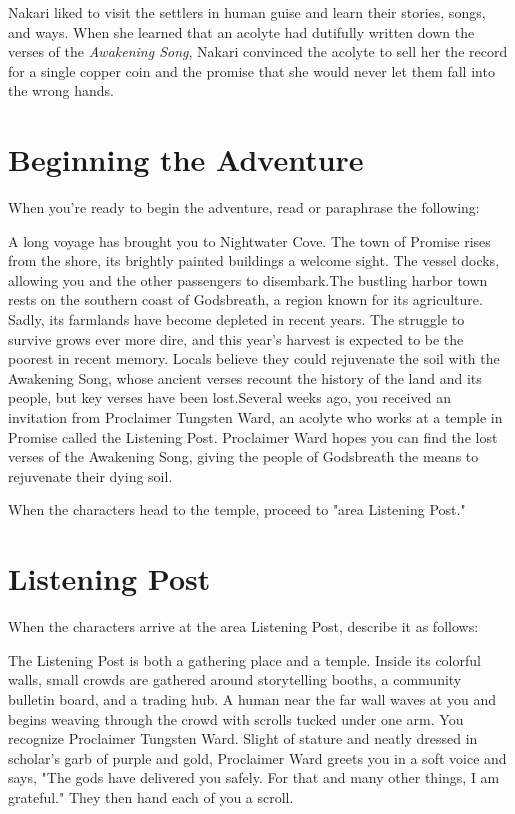 \documentclass[letterpaper, 11pt, twocolumn]{dndbook}
\begin{document}
Nakari liked to visit the settlers in human guise and learn their stories, songs, and ways. When she learned that an acolyte had dutifully written down the verses of the \textit{Awakening Song}, Nakari convinced the acolyte to sell her the record for a single copper coin and the promise that she would never let them fall into the wrong hands.
\section{Beginning the Adventure}

When you're ready to begin the adventure, read or paraphrase the following:

\begin{DndReadAloud}
A long voyage has brought you to Nightwater Cove. The town of Promise rises from the shore, its brightly painted buildings a welcome sight. The vessel docks, allowing you and the other passengers to disembark.The bustling harbor town rests on the southern coast of Godsbreath, a region known for its agriculture. Sadly, its farmlands have become depleted in recent years. The struggle to survive grows ever more dire, and this year's harvest is expected to be the poorest in recent memory. Locals believe they could rejuvenate the soil with the Awakening Song, whose ancient verses recount the history of the land and its people, but key verses have been lost.Several weeks ago, you received an invitation from Proclaimer Tungsten Ward, an acolyte who works at a temple in Promise called the Listening Post. Proclaimer Ward hopes you can find the lost verses of the Awakening Song, giving the people of Godsbreath the means to rejuvenate their dying soil.
\end{DndReadAloud}

When the characters head to the temple, proceed to "area Listening Post."
\section{Listening Post}

When the characters arrive at the area Listening Post, describe it as follows:

\begin{DndReadAloud}
The Listening Post is both a gathering place and a temple. Inside its colorful walls, small crowds are gathered around storytelling booths, a community bulletin board, and a trading hub. A human near the far wall waves at you and begins weaving through the crowd with scrolls tucked under one arm. You recognize Proclaimer Tungsten Ward. Slight of stature and neatly dressed in scholar's garb of purple and gold, Proclaimer Ward greets you in a soft voice and says, "The gods have delivered you safely. For that and many other things, I am grateful." They then hand each of you a scroll.
\end{DndReadAloud}
\end{document}
